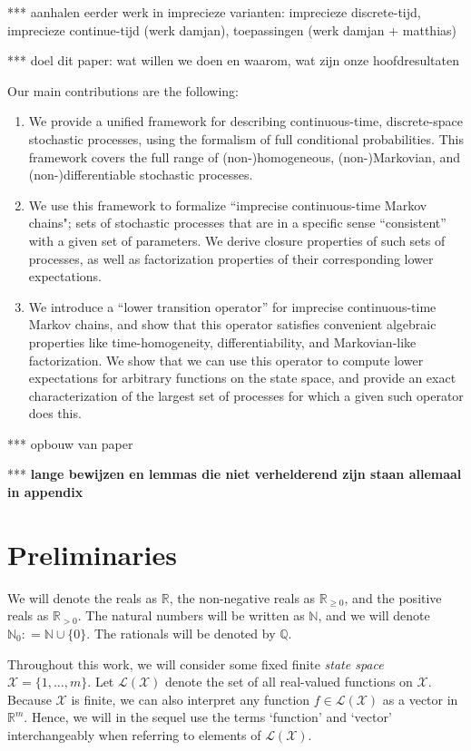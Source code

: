 \documentclass[10pt]{paper}
\theoremstyle{definition}
\newcommand{\nats}{\mathbb{N}}
\newcommand{\reals}{\mathbb{R}}
\newcommand{\realspos}{\reals_{>0}}
\newcommand{\realsnonneg}{\reals_{\geq 0}}
\newcommand{\states}{\mathcal{X}}
\newcommand{\gambles}{\mathcal{L}}
\newcommand{\gamblesX}{\gambles(\states)}
\newcommand{\coloneqq}{:\!=}
\begin{document}
*** aanhalen eerder werk in imprecieze varianten: imprecieze discrete-tijd, imprecieze continue-tijd (werk damjan), toepassingen (werk damjan + matthias)

*** doel dit paper: wat willen we doen en waarom, wat zijn onze hoofdresultaten

Our main contributions are the following:
\begin{enumerate}
\item We provide a unified framework for describing continuous-time, discrete-space stochastic processes, using the formalism of full conditional probabilities. This framework covers the full range of (non-)homogeneous, (non-)Markovian, and (non-)differentiable stochastic processes.
\item We use this framework to formalize ``imprecise continuous-time Markov chains"; sets of stochastic processes that are in a specific sense ``consistent'' with a given set of parameters. We derive closure properties of such sets of processes, as well as factorization properties of their corresponding lower expectations.
\item We introduce a ``lower transition operator'' for imprecise continuous-time Markov chains, and show that this operator satisfies convenient algebraic properties like time-homogeneity, differentiability, and Markovian-like factorization. We show that we can use this operator to compute lower expectations for arbitrary functions on the state space, and provide an exact characterization of the largest set of processes for which a given such operator does this.
\end{enumerate}

*** opbouw van paper

*** {\bf lange bewijzen en lemmas die niet verhelderend zijn staan allemaal in appendix}

\section{Preliminaries}\label{sec:prelim}

We will denote the reals as $\reals$, the non-negative reals as $\realsnonneg$, and the positive reals as $\realspos$. The natural numbers will be written as $\nats$, and we will denote $\nats_0\coloneqq\nats\cup\{0\}$. The rationals will be denoted by $\mathbb{Q}$.

Throughout this work, we will consider some fixed finite \emph{state space} $\states=\{1,\dots,m\}$. Let $\gamblesX$ denote the set of all real-valued functions on $\states$. Because $\states$ is finite, we can also interpret any function $f\in\gamblesX$ as a vector in $\reals^m$. Hence, we will in the sequel use the terms `function' and `vector' interchangeably when referring to elements of $\gamblesX$.
\end{document}
